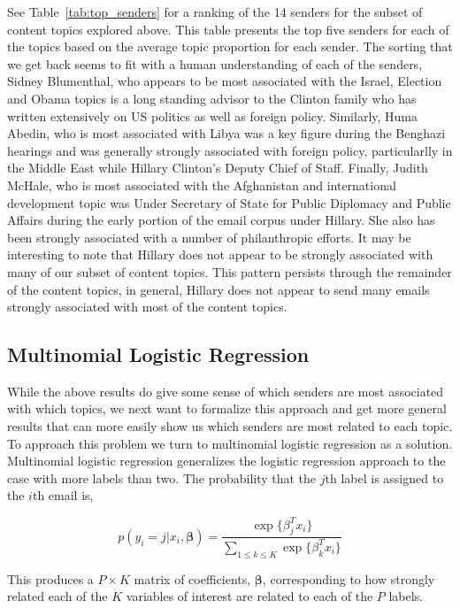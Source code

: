 \documentclass[12pt]{article}
\theoremstyle{definition}
\theoremstyle{algodesc}
\begin{document}
See Table~\ref{tab:top_senders} for a ranking of the 14 senders for the subset of content topics explored above. This table presents the top five senders for each of the topics based on the average topic proportion for each sender. The sorting that we get back seems to fit with a human understanding of each of the senders, Sidney Blumenthal, who appears to be most associated with the Israel, Election and Obama topics is a long standing advisor to the Clinton family who has written extensively on US politics as well as foreign policy. Similarly, Huma Abedin, who is most associated with Libya was a key figure during the Benghazi hearings and was generally strongly associated with foreign policy, particularlly in the Middle East while Hillary Clinton's Deputy Chief of Staff. Finally, Judith McHale, who is most associated with the Afghanistan and international development topic was Under Secretary of State for Public Diplomacy and Public Affairs during the early portion of the email corpus under Hillary. She also has been strongly associated with a number of philanthropic efforts. It may be interesting to note that Hillary does not appear to be strongly associated with many of our subset of content topics. This pattern persists through the remainder of the content topics, in general, Hillary does not appear to send many emails strongly associated with most of the content topics.


\subsection{Multinomial Logistic Regression}
While the above results do give some sense of which senders are most associated with which topics, we next want to formalize this approach and get more general results that can more easily show us which senders are most related to each topic. To approach this problem we turn to multinomial logistic regression as a solution. Multinomial logistic regression generalizes the logistic regression approach to the case with more labels than two. The probability that the $j$th label is assigned to the $i$th email is,

\begin{equation} \label{eq:smax}
p(y_i = j | x_i, \boldsymbol{\beta}) = \frac{\exp\{\beta_j^Tx_i\}}{\sum_{1\leq k\leq K} \exp\{\beta_k^Tx_i\}}
\end{equation}

This produces a $P \times K$ matrix of coefficients, $\boldsymbol{\beta}$, corresponding to how strongly related each of the $K$ variables of interest are related to each of the $P$ labels.
\end{document}
